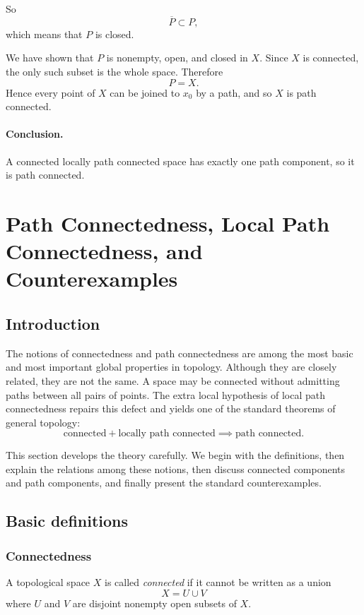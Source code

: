 \documentclass[12pt,a4paper]{article}
\theoremstyle{notespace}
\begin{document}
So
\[
\overline{P}\subset P,
\]
which means that \(P\) is closed.

We have shown that \(P\) is nonempty, open, and closed in \(X\). Since \(X\) is connected, the only such subset is the whole space. Therefore
\[
P=X.
\]
Hence every point of \(X\) can be joined to \(x_0\) by a path, and so \(X\) is path connected.

\paragraph{Conclusion.}
A connected locally path connected space has exactly one path component, so it is path connected.

\section{Path Connectedness, Local Path Connectedness, and Counterexamples}

\subsection{Introduction}

The notions of connectedness and path connectedness are among the most basic and most important global properties in topology. Although they are closely related, they are not the same. A space may be connected without admitting paths between all pairs of points. The extra local hypothesis of local path connectedness repairs this defect and yields one of the standard theorems of general topology:
\[
\text{connected} + \text{locally path connected} \implies \text{path connected}.
\]

This section develops the theory carefully. We begin with the definitions, then explain the relations among these notions, then discuss connected components and path components, and finally present the standard counterexamples.

\subsection{Basic definitions}

\subsubsection{Connectedness}

A topological space \(X\) is called \emph{connected} if it cannot be written as a union
\[
X=U\cup V
\]
where \(U\) and \(V\) are disjoint nonempty open subsets of \(X\).
\end{document}
